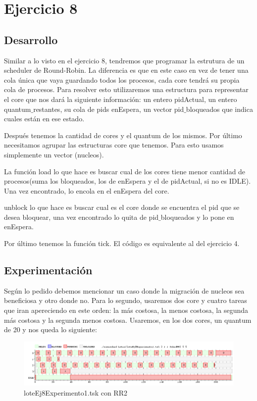 \section{Ejercicio 8}


\subsection{Desarrollo}
Similar  a lo visto en el ejercicio 8, tendremos que programar la estrutura de un scheduler de Round-Robin. La diferencia es que en este caso en vez de tener una cola única 
que vaya guardando todos los procesos, cada core tendrá su propia cola de procesos. Para resolver esto utilizaremos una estructura para representar el core que nos dará la 
siguiente información: un entero pidActual, un entero quantum$\_$restantes, su cola de pids enEspera, un vector pid$\_$bloqueados que indica cuales están en ese estado.

Después tenemos la cantidad de cores y el quantum de los mismos. Por último necesitamos agrupar las estructuras core que tenemos. Para esto usamos simplemente un vector 
(nucleos).

La función load lo que hace es buscar cual de los cores tiene menor cantidad de procesos(suma los bloqueados, los de enEspera y el de pidActual, si no es IDLE). Una vez 
encontrado, lo encola en el enEspera del core.

unblock lo que hace es buscar cual es el core donde se encuentra el pid que se desea bloquear, una vez encontrado lo quita de pid$\_$bloqueados y lo pone en enEspera.

Por último tenemos la función tick. El código es equivalente al del ejercicio 4.


\subsection{Experimentación}
Según lo pedido debemos mencionar un caso donde la migración de nucleos sea beneficiosa y otro donde no. Para lo segundo, usaremos dos core y cuatro tareas que iran apereciendo
en este orden: la más costosa,  la menos costosa, la segunda más costosa y la segunda menos costosa. Usaremos, en los dos cores, un quantum de 20 y nos queda lo siguiente:

\begin{figure}[H]
  \centering
    \includegraphics[width=1.1\textwidth]{imagenes/Ej8Experimento1.png}
  \caption{loteEj8Experimento1.tsk con RR2}
\end{figure}

